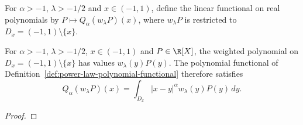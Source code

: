 \begin{supporting}
\begin{definition}
\label{def:power-law-polynomial-functional}
\leanok
For $\alpha>-1$, $\lambda>-1/2$ and $x\in(-1,1)$, define the linear functional
on real polynomials by $P\mapsto Q_\alpha(w_\lambda P)(x)$, where $w_\lambda P$ is restricted to $D_x=(-1,1)\setminus\{x\}$.
\end{definition}
\begin{theorem}
\label{thm:power-law-polynomial-functional}
\leanok
For $\alpha>-1$, $\lambda>-1/2$, $x\in(-1,1)$ and $P\in\R[X]$,
the weighted polynomial on $D_x=(-1,1)\setminus\{x\}$ has values
$w_\lambda(y)P(y)$. The polynomial functional of
Definition~\ref{def:power-law-polynomial-functional} therefore satisfies
\[
 Q_\alpha(w_\lambda P)(x)=\int_{D_x}|x-y|^\alpha w_\lambda(y)P(y)\,dy.
\]
\end{theorem}
\begin{proof}
\leanok
\end{proof}


\end{supporting}
